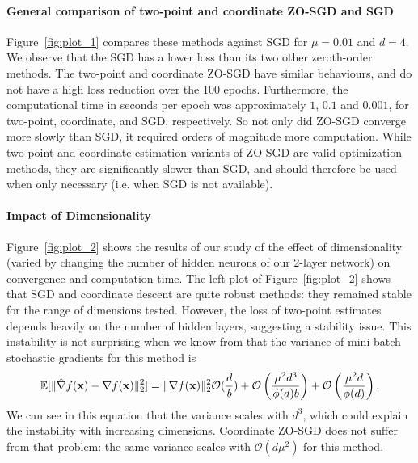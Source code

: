 \paragraph{General comparison of two-point and coordinate ZO-SGD and SGD}
Figure~\ref{fig:plot_1} compares these methods against SGD for $\mu = 0.01$ and $d = 4$. We observe that the SGD  has a lower loss than its two other zeroth-order methods. The two-point and coordinate ZO-SGD have similar behaviours, and do not have a high loss reduction over the 100 epochs. Furthermore, the computational time in seconds per epoch was approximately $1$, $0.1$ and $0.001$, for two-point, coordinate, and SGD, respectively. So not only did ZO-SGD converge more slowly than SGD, it required orders of magnitude more computation. While two-point and coordinate estimation variants of ZO-SGD are valid optimization methods, they are significantly slower than SGD, and should therefore be used when only necessary (i.e. when SGD is not available).

\paragraph{Impact of Dimensionality}

Figure~\ref{fig:plot_2} shows the results of our study of the effect of dimensionality (varied by changing the number of hidden neurons of our 2-layer network) on convergence and computation time. The left plot of  Figure~\ref{fig:plot_2} shows that SGD and coordinate descent are quite robust methods: they remained stable for the range of dimensions tested. However, the loss of two-point estimates depends heavily on the number of hidden layers, suggesting a stability issue. This instability is not surprising when we know from \cite{liu2020primer} that the variance of mini-batch stochastic gradients for this method is
\begin{equation}\label{eqn:mse_mult_batch}
   \mathbb{E}[\| \hat{\nabla}f(\bold{x})- \nabla f(\bold{x}) \|^2_2] = \|\nabla f(\bold{x})\|^2_2 \mathcal{O}(\frac{d}{b}) + \mathcal{O}\left(\frac{\mu^2d^3}{\phi(d)b}\right)+ \mathcal{O}\left(\frac{\mu^2d}{\phi(d)}\right).
\end{equation}
We can see in this equation that the variance scales with $d^3$, which could explain the instability with increasing dimensions. Coordinate ZO-SGD does not suffer from that problem: the same variance scales with $\mathcal{O}\left(d\mu^2\right)$ for this method.


